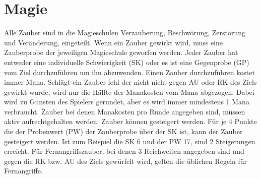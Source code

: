 \documentclass[../../Heldenanleitung2]{subfiles}
\begin{document}
\chapter{Magie}

Alle Zauber sind in die Magieschulen Verzauberung, Beschwörung, Zerstörung und Veränderung, eingeteilt. Wenn ein Zauber gewirkt wird, muss eine Zauberprobe der jeweiligen Magieschule geworfen werden. Jeder Zauber hat entweder eine individuelle Schwierigkeit (SK) oder es ist eine Gegenprobe (GP) vom Ziel durchzuführen um ihn abzuwenden. Einen Zauber durchzuführen kostet immer Mana. Schlägt ein Zauber fehl der nicht nicht gegen AU oder RK des Ziels gewirkt wurde, wird nur die Hälfte der Manakosten vom Mana abgezogen. Dabei wird zu Gunsten des Spielers gerundet, aber es wird immer mindestens 1 Mana verbraucht. Zauber bei denen Manakosten pro Runde angegeben sind, müssen aktiv aufrechtgehalten werden. Zauber können gesteigert werden. Für je 4 Punkte die der Probenwert (PW) der Zauberprobe über der SK ist, kann der Zauber gesteigert werden. Ist zum Beispiel die SK 6 und der PW 17, sind 2 Steigerungen erreicht. Für Fernangriffszauber, bei denen 3 Reichweiten angegeben sind und gegen die RK bzw. AU des Ziels gewürfelt wird, gelten die üblichen Regeln für Fernangriffe. 
\\
\end{document}

